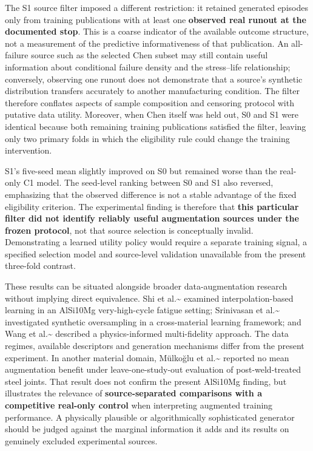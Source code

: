 \documentclass[12pt,a4paper]{article}
\begin{document}
The S1 source filter imposed a different restriction: it retained generated episodes only from training publications with at least one \textbf{observed real runout at the documented stop}. This is a coarse indicator of the available outcome structure, not a measurement of the predictive informativeness of that publication. An all-failure source such as the selected Chen subset may still contain useful information about conditional failure density and the stress–life relationship; conversely, observing one runout does not demonstrate that a source's synthetic distribution transfers accurately to another manufacturing condition. The filter therefore conflates aspects of sample composition and censoring protocol with putative data utility. Moreover, when Chen itself was held out, S0 and S1 were identical because both remaining training publications satisfied the filter, leaving only two primary folds in which the eligibility rule could change the training intervention.

S1's five-seed mean slightly improved on S0 but remained worse than the real-only C1 model. The seed-level ranking between S0 and S1 also reversed, emphasizing that the observed difference is not a stable advantage of the fixed eligibility criterion. The experimental finding is therefore that \textbf{this particular filter did not identify reliably useful augmentation sources under the frozen protocol}, not that source selection is conceptually invalid. Demonstrating a learned utility policy would require a separate training signal, a specified selection model and source-level validation unavailable from the present three-fold contrast.

These results can be situated alongside broader data-augmentation research without implying direct equivalence. Shi et al.\textasciitilde{}\cite{shi2023} examined interpolation-based learning in an AlSi10Mg very-high-cycle fatigue setting; Srinivasan et al.\textasciitilde{}\cite{srinivasan2024} investigated synthetic oversampling in a cross-material learning framework; and Wang et al.\textasciitilde{}\cite{wang2025} described a physics-informed multi-fidelity approach. The data regimes, available descriptors and generation mechanisms differ from the present experiment. In another material domain, Mülkoğlu et al.\textasciitilde{}\cite{mulkoglu2026} reported no mean augmentation benefit under leave-one-study-out evaluation of post-weld-treated steel joints. That result does not confirm the present AlSi10Mg finding, but illustrates the relevance of \textbf{source-separated comparisons with a competitive real-only control} when interpreting augmented training performance. A physically plausible or algorithmically sophisticated generator should be judged against the marginal information it adds and its results on genuinely excluded experimental sources.
\end{document}
